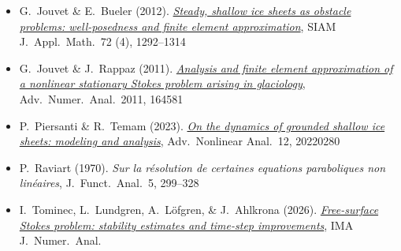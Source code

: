 \begin{itemize}
\item G.~Jouvet \& E.~Bueler (2012). \href{https://doi.org/10.1137/110856654}{\emph{Steady, shallow ice sheets as obstacle problems: well-posedness and finite element approximation}}, SIAM J.~Appl.~Math.~72 (4), 1292--1314

\item G.~Jouvet \& J.~Rappaz (2011). \href{https://doi.org/10.1155/2011/164581}{\emph{Analysis and finite element approximation of a nonlinear stationary Stokes problem arising in glaciology}}, Adv.~Numer.~Anal.~2011, 164581



\item P.~Piersanti \& R.~Temam (2023). \href{https://doi.org/10.1515/anona-2022-0280}{\emph{On the dynamics of grounded shallow ice sheets: modeling and analysis}}, Adv.~Nonlinear Anal.~12, 20220280

\item P.~Raviart (1970). \emph{Sur la r\'esolution de certaines equations paraboliques non lin\'eaires}, J.~Funct.~Anal.~5, 299--328

\item I.~Tominec, L.~Lundgren, A.~L\"ofgren, \& J.~Ahlkrona (2026). \href{https://doi.org/10.1093/imanum/drag117}{\emph{Free-surface Stokes problem: stability estimates and time-step improvements}}, IMA J.~Numer.~Anal.
\end{itemize}
